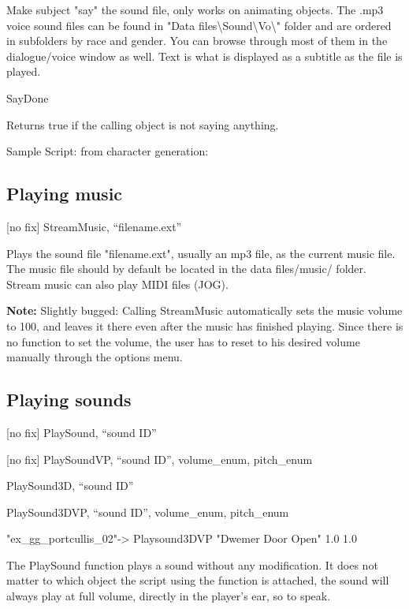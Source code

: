 Make subject "say" the sound file, only works on animating objects. The
.mp3 voice sound files can be found in "Data
files\textbackslash Sound\textbackslash Vo\textbackslash" folder and are
ordered in subfolders by race and gender. You can browse through most of
them in the dialogue/voice window as well. Text is what is displayed as
a subtitle as the file is played.

SayDone

Returns true if the calling object is not saying anything.

Sample Script: from character generation:



\hypertarget{playing-music}{%
\subsection{Playing music}\label{playing-music}}

{[}no fix{]} StreamMusic, ``filename.ext''

Plays the sound file "filename.ext", usually an mp3 file, as the current
music file. The music file should by default be located in the data
files/music/ folder. Stream music can also play MIDI files (JOG).

\textbf{Note:} Slightly bugged: Calling StreamMusic automatically sets
the music volume to 100, and leaves it there even after the music has
finished playing. Since there is no function to set the volume, the user
has to reset to his desired volume manually through the options menu.

\hypertarget{playing-sounds}{%
\subsection{Playing sounds}\label{playing-sounds}}

{[}no fix{]} PlaySound, ``sound ID''

{[}no fix{]} PlaySoundVP, ``sound ID'', volume\_enum, pitch\_enum

PlaySound3D, ``sound ID''

PlaySound3DVP, ``sound ID'', volume\_enum, pitch\_enum

"ex\_gg\_portcullis\_02"-> Playsound3DVP "Dwemer Door Open"
1.0 1.0

The PlaySound function plays a sound without any modification. It does
not matter to which object the script using the function is attached,
the sound will always play at full volume, directly in the player's ear,
so to speak.

